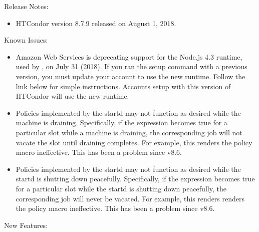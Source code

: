 \noindent Release Notes:

\begin{itemize}

\item HTCondor version 8.7.9 released on August 1, 2018.

\end{itemize}


\noindent Known Issues:

\begin{itemize}

\item Amazon Web Services is deprecating support for the Node.js 4.3 runtime,
used by , on July 31 (2018).  If you ran the  setup
command with a previous version, you must update your account to use the new
runtime.  Follow the link below for simple instructions.  Accounts setup with
this version of HTCondor will use the new runtime.

\item Policies implemented by the startd may not function as desired while
the machine is draining.  Specifically, if the  expression
becomes true for a particular slot while a machine is draining, the
corresponding job will not vacate the slot until draining completes.  For
example, this renders the policy macro 
ineffective.  This has been a problem since v8.6.

\item Policies implemented by the startd may not function as desired while
the startd is shutting down peacefully.  Specifically, if the 
expression becomes true for a particular slot while the startd is shutting
down peacefully, the corresponding job will never be vacated.  For example,
this renders renders the policy macro 
ineffective.  This has been a problem since v8.6.

\end{itemize}


\noindent New Features:

